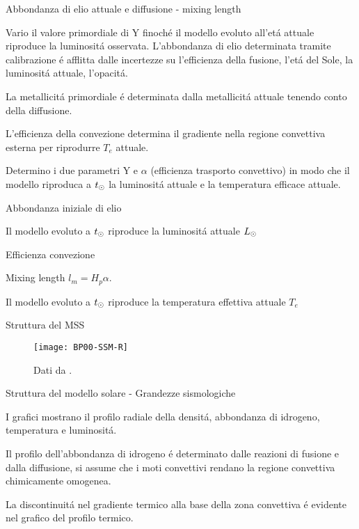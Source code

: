 \documentclass[10pt,xcolor={usenames},fleqn,mathserif,serif]{beamer}
\begin{document}
\begin{wordonframe}{Abbondanza di elio attuale e diffusione - mixing length}

Vario il valore primordiale di Y finoch\'e il modello evoluto all'et\'a attuale riproduce la luminosit\'a osservata. L'abbondanza di elio determinata tramite calibrazione \'e afflitta dalle incertezze su l'efficienza della fusione, l'et\'a del Sole, la luminosit\'a attuale, l'opacit\'a.

La metallicit\'a primordiale \'e determinata dalla metallicit\'a attuale tenendo conto della diffusione.

L'efficienza della convezione determina il gradiente nella regione convettiva esterna per riprodurre $T_e$ attuale.

Determino i due parametri Y e $\alpha$ (efficienza trasporto convettivo) in modo che il modello riproduca a $t_{\odot}{}$ la luminosit\'a attuale e la temperatura efficace attuale.

\begin{block}{Abbondanza iniziale di elio}

Il modello evoluto a $t_{\odot}{}$ riproduce la luminosit\'a attuale $L_{\odot}{}$

\end{block}

\begin{block}{Efficienza convezione}

Mixing length $l_m=H_p\alpha$.

Il modello evoluto a $t_{\odot}{}$ riproduce la temperatura effettiva attuale $T_e$

\end{block}

\end{wordonframe}

\begin{frame}{Struttura del MSS}

\begin{figure}[!h]
\texttt{[image: BP00-SSM-R]}
\caption{Dati da \cite{BP2000}.}
\end{figure}

\end{frame}

\begin{wordonframe}{Struttura del modello solare - Grandezze sismologiche}

I grafici mostrano il profilo radiale della densit\'a, abbondanza di idrogeno, temperatura e luminosit\'a.

Il profilo dell'abbondanza di idrogeno \'e determinato dalle reazioni di fusione e dalla diffusione, si assume che i moti convettivi rendano la regione convettiva chimicamente omogenea.

La discontinuit\'a nel gradiente termico alla base della zona convettiva \'e evidente nel grafico del profilo termico.

\end{wordonframe}
\end{document}
